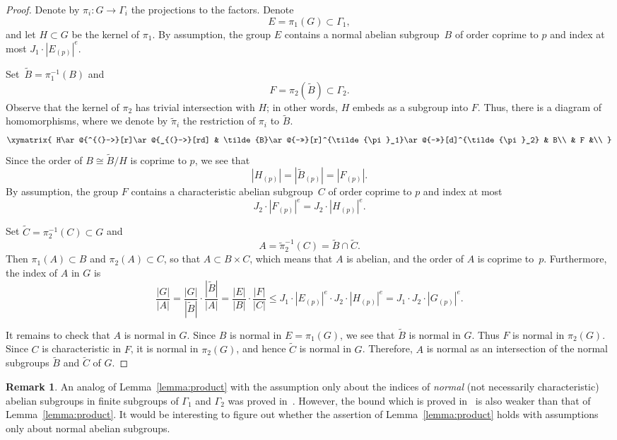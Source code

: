 \documentclass[12pt]{amsart}
\numberwithin{equation}{section}
\theoremstyle{definition}
\newtheorem{remark}[subsection]{Remark}
\def \le {\leqslant}
\begin{document}
\begin{proof}
Denote by $\pi_i\colon G\to \Gamma_i$ the projections to the factors.
Denote
$$
E=\pi_1(G)\subset\Gamma_1,
$$
and let $H\subset G$ be the kernel of $\pi_1$.
By assumption, the group $E$ contains a normal abelian subgroup~$B$ of order coprime to $p$
and index at most $J_1\cdot |E_{(p)}|^e$.

Set~\mbox{$\tilde{B}=\pi_1^{-1}(B)$}
and
$$
F=\pi_2(\tilde{B})\subset \Gamma_2.
$$
Observe that the kernel of $\pi_2$ has trivial
intersection with $H$; in other words, $H$
embeds as a subgroup into $F$. Thus, there is a diagram of homomorphisms, where
we denote by $\tilde{\pi}_i$ the restriction of $\pi_i$ to $\tilde{B}$.
$$
\xymatrix{
H\ar@{^{(}->}[r]\ar@{_{(}->}[rd] &
\tilde{B}\ar@{->>}[r]^{\tilde{\pi}_1}\ar@{->>}[d]^{\tilde{\pi}_2} & B\\
& F &\\
}
$$
Since the order of $B\cong \tilde{B}/H$ is coprime to $p$, we see that
$$
|H_{(p)}|=|\tilde{B}_{(p)}|=|F_{(p)}|.
$$
By assumption, the group $F$ contains a characteristic abelian subgroup~$C$ of order coprime to $p$
and index at most
$$
J_2\cdot |F_{(p)}|^e=J_2\cdot |H_{(p)}|^e.
$$

Set $\tilde{C}=\pi_2^{-1}(C)\subset G$
and
$$
A=\tilde{\pi}_2^{-1}(C)=\tilde{B}\cap \tilde{C}.
$$
Then $\pi_1(A)\subset B$ and $\pi_2(A)\subset C$,
so that $A\subset B\times C$, which means that $A$ is abelian, and the order of $A$ is coprime to~$p$. Furthermore, the index of $A$ in $G$ is
$$
\frac{|G|}{|A|}=\frac{|G|}{|\tilde{B}|}\cdot\frac{|\tilde{B}|}{|A|}=
\frac{|E|}{|B|}\cdot \frac{|F|}{|C|}\le
J_1\cdot |E_{(p)}|^e\cdot J_2\cdot |H_{(p)}|^e=
J_1\cdot J_2\cdot |G_{(p)}|^e.
$$

It remains to check that $A$ is normal in $G$. Since $B$ is normal in $E=\pi_1(G)$,
we see that $\tilde{B}$ is normal in $G$. Thus $F$ is normal in $\pi_2(G)$.
Since $C$ is characteristic in $F$, it is normal in $\pi_2(G)$, and hence $\tilde{C}$
is normal in $G$. Therefore, $A$ is normal as an intersection of the normal
subgroups $\tilde{B}$ and $\tilde{C}$ of $G$.
\end{proof}

\begin{remark}
An analog of Lemma~\ref{lemma:product} with the assumption only about the indices of \emph{normal}
(not necessarily characteristic)  abelian subgroups in finite subgroups of $\Gamma_1$ and $\Gamma_2$ was proved in~\mbox{\cite[Lemma~2.1(2)]{Hu}}. However, the bound which is proved in~\cite{Hu} is also weaker
than that of Lemma~\ref{lemma:product}. It would be
interesting to figure out whether the assertion of Lemma~\ref{lemma:product}
holds with assumptions only about normal abelian subgroups.
\end{remark}
\end{document}
